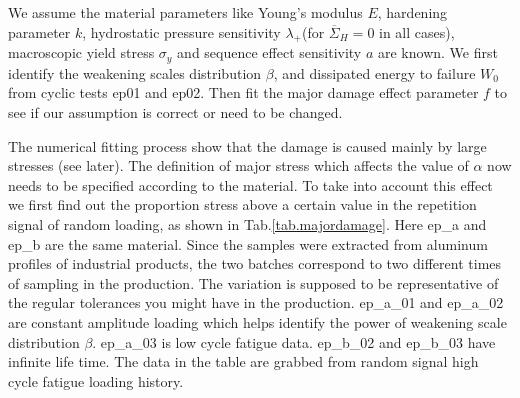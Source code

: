 \documentclass[3p,times,procedia,number]{elsarticle}
\begin{document}
We assume the material parameters like Young's modulus $E$, hardening parameter $k$, hydrostatic pressure sensitivity $\lambda_+$(for $\overline{\Sigma}_H=0$ in all cases), macroscopic yield stress $\sigma_y$ and sequence effect sensitivity $a$ are known. We first identify the weakening scales distribution $\beta$, and dissipated energy to failure $W_0$ from cyclic tests ep01 and ep02. Then fit the major damage effect parameter $f$ to see if our assumption is correct or need to be changed. 


The numerical fitting process show that the damage is caused mainly by large stresses (see later). The definition of major stress which affects the value of $\alpha$ now needs to be specified according to the material. To take into account this effect we first find out the proportion stress above a certain value in the repetition signal of random loading, as shown in Tab.\ref{tab.majordamage}.  Here ep\_a and ep\_b are the same material. Since the samples were extracted from aluminum profiles of industrial products,  the two batches correspond to two different times of sampling in the production. The variation is supposed to be representative of the regular tolerances you might have in the production. ep\_a\_01 and ep\_a\_02 are constant amplitude loading which helps identify the power of weakening scale distribution $\beta$. ep\_a\_03 is low cycle fatigue data.  ep\_b\_02 and ep\_b\_03 have infinite life time. The data in the table are grabbed from random signal high cycle fatigue loading history.
\end{document}
